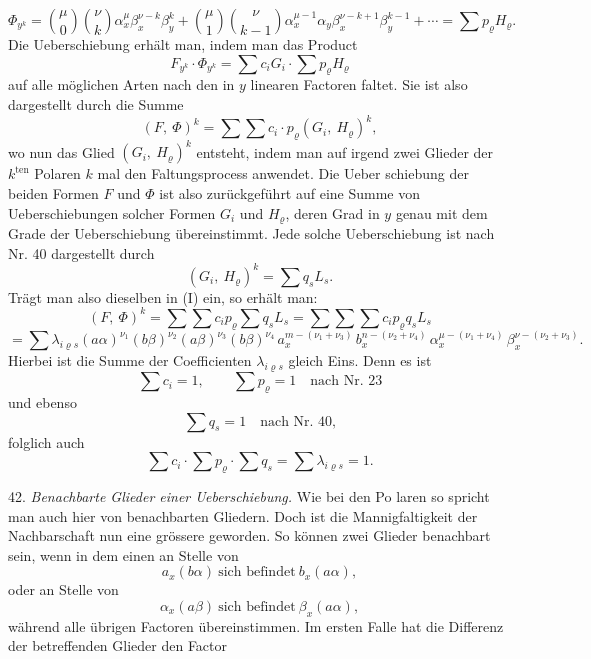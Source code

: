 \documentclass[11pt]{article}
\providecommand{\weberpage}[1]{}
\providecommand{\weq}[2]{\begin{equation}\tag{#1}#2\end{equation}}
\let\Phi\varPhi
\begin{document}
\weberpage{43}
\[
\Phi_{y^k} = \binom{\mu}{0}\binom{\nu}{k} \alpha_x^\mu \beta_x^{\nu-k} \beta_y^k + \binom{\mu}{1}\binom{\nu}{k-1} \alpha_x^{\mu-1} \alpha_y \beta_x^{\nu-k+1} \beta_y^{k-1} + \cdots = \sum p_\varrho H_\varrho.
\]
Die Ueberschiebung erhält man, indem man das Product
\[
F_{y^k}\cdot \Phi_{y^k} = \sum c_i G_i \cdot \sum p_\varrho H_\varrho
\]
auf alle möglichen Arten nach den in $y$ linearen Factoren faltet. Sie
ist also dargestellt durch die Summe
\weq{I}{(F,\ \Phi)^k = \sum\sum c_i\cdot p_\varrho (G_i,\ H_\varrho)^k,}
wo nun das Glied $(G_i,\ H_\varrho)^k$ entsteht, indem man auf irgend zwei
Glieder der $k^{\text{ten}}$ Polaren $k$ mal den Faltungsprocess anwendet. Die Ueber\-
schiebung der beiden Formen $F$ und $\Phi$ ist also zurückgeführt auf
eine Summe von Ueberschiebungen solcher Formen $G_i$ und $H_\varrho$, deren
Grad in $y$ genau mit dem Grade der Ueberschiebung übereinstimmt.
Jede solche Ueberschiebung ist nach Nr. 40 dargestellt durch
\[
(G_i,\ H_\varrho)^k = \sum q_s L_s.
\]
Trägt man also dieselben in (I) ein, so erhält man:
\[
(F,\ \Phi)^k = \sum\sum c_i p_\varrho \sum q_s L_s = \sum\sum\sum c_i p_\varrho q_s L_s
\]
\[
= \sum \lambda_{i\varrho s}(a\alpha)^{\nu_1}(b\beta)^{\nu_2}(a\beta)^{\nu_3}(b\beta)^{\nu_4}\, a_x^{m-(\nu_1+\nu_3)}\, b_x^{n-(\nu_2+\nu_4)}\, \alpha_x^{\mu-(\nu_1+\nu_4)}\, \beta_x^{\nu-(\nu_2+\nu_3)}.
\]
Hierbei ist die Summe der Coefficienten $\lambda_{i\varrho s}$ gleich Eins. Denn
es ist
\[
\sum c_i = 1, \qquad \sum p_\varrho = 1 \quad \text{nach Nr. 23}
\]
und ebenso
\[
\sum q_s = 1 \quad \text{nach Nr. 40,}
\]
folglich auch
\[
\sum c_i \cdot \sum p_\varrho \cdot \sum q_s = \sum \lambda_{i\varrho s} = 1.
\]

42. \textit{Benachbarte Glieder einer Ueberschiebung.} Wie bei den Po\-
laren so spricht man auch hier von benachbarten Gliedern. Doch ist
die Mannigfaltigkeit der Nachbarschaft nun eine grössere geworden.
So können zwei Glieder benachbart sein, wenn in dem einen an
Stelle von
\weq{1}{a_x (b\alpha)\ \text{sich befindet}\ b_x (a\alpha),}
oder an Stelle von
\weq{2}{\alpha_x (a\beta)\ \text{sich befindet}\ \beta_x (a\alpha),}
während alle übrigen Factoren übereinstimmen. Im ersten Falle hat
die Differenz der betreffenden Glieder den Factor
\end{document}

